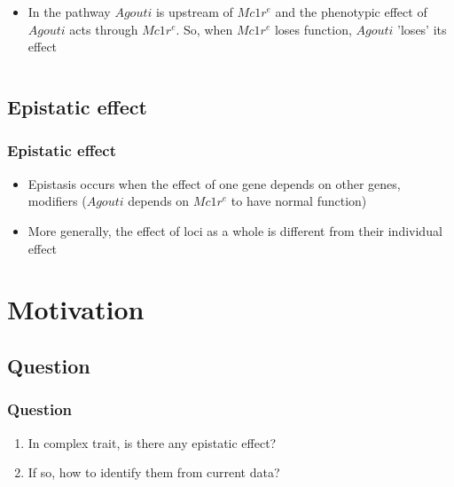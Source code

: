 \documentclass{beamer}
\begin{document}
\begin{frame}
\begin{columns}
\begin{column}{.54\textwidth}
        \label{fig:epi2}
        \begin{itemize}
          \item In the pathway $Agouti$ is upstream of $Mc1r^e$ and the phenotypic effect of $Agouti$ acts through $Mc1r^e$. So, when $Mc1r^e$ loses function, $Agouti$ 'loses' its effect
        \end{itemize}
      \end{column}
    \end{columns}
  \end{frame}

  \subsection{Epistatic effect}
  \begin{frame}
  \frametitle{Epistatic effect}
    \begin{itemize}
      \item Epistasis occurs when the effect of one gene depends on other genes, modifiers ($Agouti$ depends on $Mc1r^e$ to have normal function)
      \item More generally, the effect of loci as a whole is different from their individual effect
    \end{itemize}
  \end{frame}

  \section{Motivation}

    \subsection{Question}
    \begin{frame}
    \frametitle{Question}
      \begin{enumerate}
        \item In complex trait, is there any epistatic effect?
        \item If so, how to identify them from current data?
      \end{enumerate}
    \end{frame}
\end{document}
